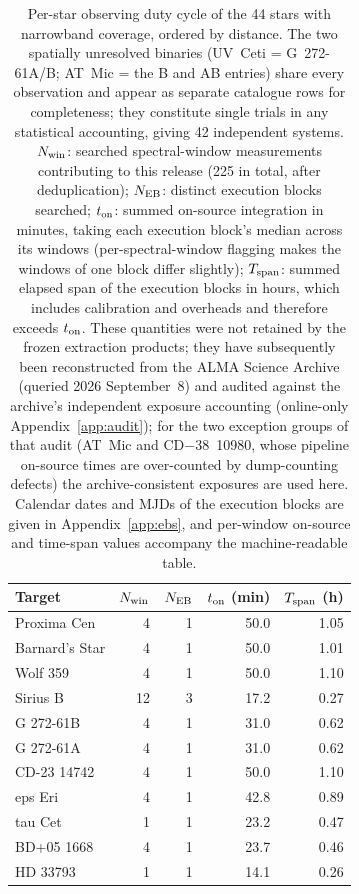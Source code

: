 \documentclass{openjournal}
\begin{document}
\begin{table}
\centering
\small
\caption{Per-star observing duty cycle of the 44 stars with narrowband
coverage, ordered by distance. The two spatially unresolved binaries
(UV~Ceti = G~272-61A/B; AT~Mic = the B and AB entries) share every
observation and appear as separate catalogue rows for completeness;
they constitute single trials in any statistical accounting, giving 42
independent systems. $N_{\rm win}$: searched spectral-window
measurements contributing to this release (225 in total, after
deduplication); $N_{\rm EB}$: distinct execution blocks searched;
$t_{\rm on}$: summed on-source integration in minutes, taking each
execution block's median across its windows (per-spectral-window
flagging makes the windows of one block differ slightly);
$T_{\rm span}$: summed elapsed span of the execution blocks in hours,
which includes calibration and overheads and therefore exceeds
$t_{\rm on}$. These quantities were not retained by the frozen
extraction products; they have subsequently been reconstructed from
the ALMA Science Archive (queried 2026 September~8) and audited
against the archive's independent exposure accounting
(online-only Appendix~\ref{app:audit}); for the two exception groups of that audit
(AT~Mic and CD$-$38~10980, whose pipeline on-source times are
over-counted by dump-counting defects) the archive-consistent
exposures are used here. Calendar dates and MJDs of the execution
blocks are given in Appendix~\ref{app:ebs}, and per-window on-source
and time-span values accompany the
machine-readable table.}
\label{tab:duty}
\setlength{\tabcolsep}{4pt}
\begin{tabular}{@{}lrrrr@{}}
\hline
Target & $N_{\rm win}$ & $N_{\rm EB}$ & $t_{\rm on}$ (min) & $T_{\rm span}$ (h) \\
\hline
Proxima Cen & 4 & 1 & 50.0 & 1.05 \\
Barnard's Star & 4 & 1 & 50.0 & 1.01 \\
Wolf  359 & 4 & 1 & 50.0 & 1.10 \\
Sirius B & 12 & 3 & 17.2 & 0.27 \\
G 272-61B & 4 & 1 & 31.0 & 0.62 \\
G 272-61A & 4 & 1 & 31.0 & 0.62 \\
CD-23 14742 & 4 & 1 & 50.0 & 1.10 \\
eps Eri & 4 & 1 & 42.8 & 0.89 \\
tau Cet & 1 & 1 & 23.2 & 0.47 \\
BD+05  1668 & 4 & 1 & 23.7 & 0.46 \\
HD 33793 & 1 & 1 & 14.1 & 0.26 \\

\end{tabular}
\end{table}
\end{document}
